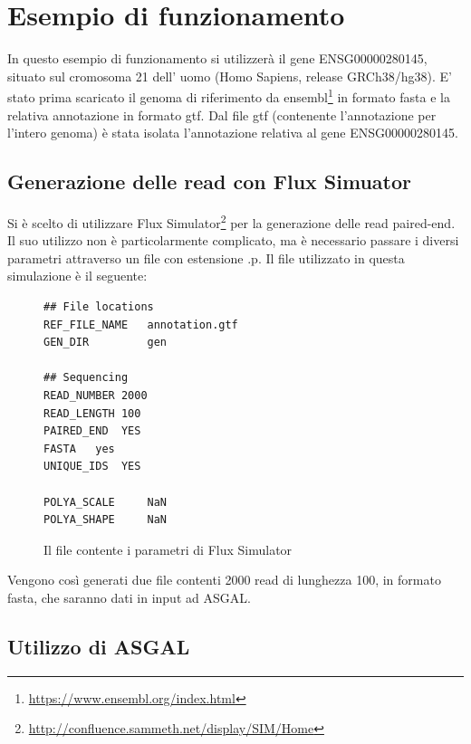\section{Esempio di funzionamento}

In questo esempio di funzionamento si utilizzerà il gene ENSG00000280145, situato sul cromosoma 21 dell' uomo (Homo Sapiens, release GRCh38/hg38). E' stato prima scaricato il genoma di riferimento da ensembl\footnote{\url{https://www.ensembl.org/index.html}} in formato fasta e la relativa annotazione in formato gtf. Dal file gtf (contenente l'annotazione per l'intero genoma) è stata isolata l'annotazione relativa al gene ENSG00000280145.

\subsection{Generazione delle read con Flux Simuator}

Si è scelto di utilizzare Flux Simulator\footnote{\url{http://confluence.sammeth.net/display/SIM/Home}} per la generazione delle read paired-end. Il suo utilizzo non è particolarmente complicato, ma è necessario passare i diversi parametri attraverso un file con estensione .p. Il file utilizzato in questa simulazione è il seguente:

\begin{figure}[thp]
\begin{CenteredBox}
  \begin{lstlisting}
## File locations
REF_FILE_NAME   annotation.gtf
GEN_DIR         gen

## Sequencing
READ_NUMBER 2000
READ_LENGTH 100
PAIRED_END  YES
FASTA   yes
UNIQUE_IDS  YES

POLYA_SCALE     NaN
POLYA_SHAPE     NaN
  \end{lstlisting}
\end{CenteredBox}
\caption{Il file contente i parametri di Flux Simulator}
\end{figure}


Vengono così generati due file contenti 2000 read di lunghezza 100, in formato fasta, che saranno dati in input ad ASGAL.

\newpage

\subsection{Utilizzo di ASGAL}

